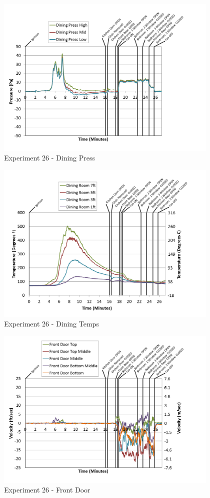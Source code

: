 \documentclass{article}
\begin{document}
\begin{appendices}
\clearpage

\begin{figure}[h!]
	\centering
	\includegraphics[height=3.05in]{0_Images/Results_Charts/Exp_26_Charts/DiningPress.png}
	\caption{Experiment 26 - Dining Press}
\end{figure}


\begin{figure}[h!]
	\centering
	\includegraphics[height=3.05in]{0_Images/Results_Charts/Exp_26_Charts/DiningTemps.png}
	\caption{Experiment 26 - Dining Temps}
\end{figure}

\clearpage

\begin{figure}[h!]
	\centering
	\includegraphics[height=3.05in]{0_Images/Results_Charts/Exp_26_Charts/FrontDoor.png}
	\caption{Experiment 26 - Front Door}
\end{figure}



\end{appendices}
\end{document}
